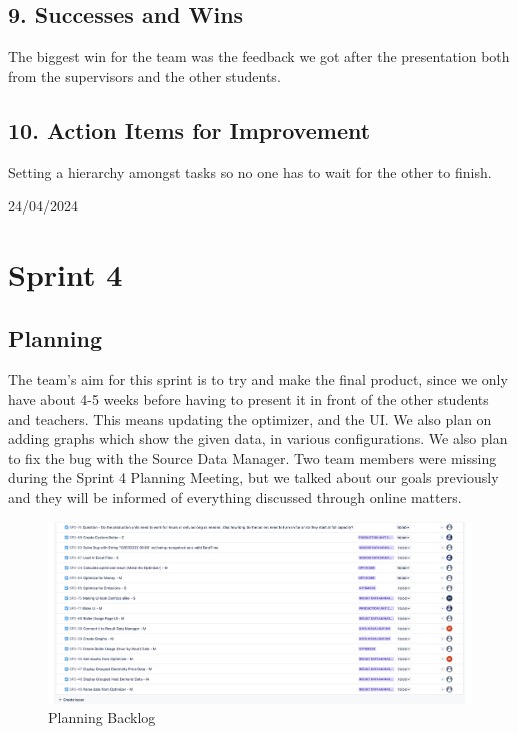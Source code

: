 \documentclass[12pt]{report}
\begin{document}
\subsection*{9. Successes and Wins}
The biggest win for the team was the feedback we got after the presentation both from the supervisors and the other students.
\subsection*{10. Action Items for Improvement}
Setting a hierarchy amongst tasks so no one has to wait for the other to finish.

\hfill 24/04/2024
\clearpage







\section{Sprint 4}
\subsection*{Planning}
The team's aim for this sprint is to try and make the final product, since we only have about 4-5 weeks before having to present it in front of the other students and teachers. This means updating the optimizer, and the UI. We also plan on adding graphs which show the given data, in various configurations. We also plan to fix the bug with the Source Data Manager. Two team members were missing during the Sprint 4 Planning Meeting, but we talked about our goals previously and they will be informed of everything discussed through online matters.

\begin{figure}[H]
  \centering
  \includegraphics[width=1\textwidth]{Resources/4-Sprint/Planning/Jira.png}
  \caption{Planning Backlog}
  \label{fig:S4Planning-image}
\end{figure}
\clearpage
\end{document}
